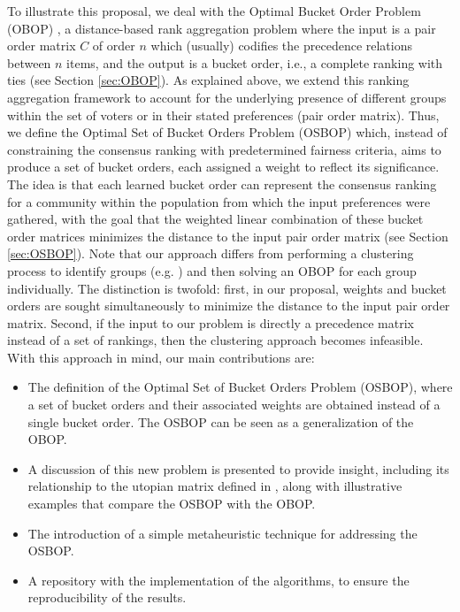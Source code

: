 \documentclass[preprint,12pt]{article}
\theoremstyle{definition}
\theoremstyle{remark}
\theoremstyle{example} %
\begin{document}
To illustrate this proposal, we deal with the Optimal Bucket Order Problem (OBOP) \cite{Gionis2006,Ukkonen2009}, a distance-based rank aggregation problem where the input is a pair order matrix $C$ of order $n$ which (usually) codifies the precedence relations between $n$ items, and the output is a bucket order, i.e., a complete ranking with ties (see Section \ref{sec:OBOP}). As explained above, we extend this ranking aggregation framework to account for the underlying presence of different groups within the set of voters or in their stated preferences (pair order matrix). Thus, we define the Optimal Set of Bucket Orders Problem (OSBOP) which, instead of constraining the consensus ranking with predetermined fairness criteria,  aims to produce a set of bucket orders, each assigned a weight to reflect its significance. The idea is that each learned bucket order can represent the consensus ranking for a community within the population from which the input preferences were gathered, with the goal that the weighted linear combination of these bucket order matrices minimizes the distance to the input pair order matrix (see Section \ref{sec:OSBOP}). Note that our approach differs from performing a clustering process to identify groups (e.g. \cite{Kamishima:2006}) and then solving an OBOP for each group individually. The distinction is twofold: first, in our proposal, weights and bucket orders are sought simultaneously to minimize the distance to the input pair order matrix. Second, if the input to our problem is directly a precedence matrix instead of a set of rankings, then the clustering approach becomes infeasible. With this approach in mind, our main contributions are:

\begin{itemize}
\item The definition of the Optimal Set of Bucket Orders Problem (OSBOP), where a set of bucket orders and their associated weights are obtained instead of a single bucket order. The OSBOP can be seen as a generalization of the OBOP.

\item A discussion of this new problem is presented to provide insight, including its relationship to the utopian matrix defined in \cite{Aledo2017Utopia}, along with illustrative examples that compare the OSBOP with the OBOP.

\item The introduction of a simple metaheuristic technique for addressing the OSBOP.

\item A repository with the implementation of the algorithms, to ensure the reproducibility of the results.
\end{itemize}
\end{document}
